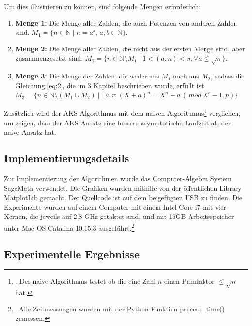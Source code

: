 \documentclass[12pt,oneside]{article}
\theoremstyle{remark}
\theoremstyle{definition}
\begin{document}
Um dies illustrieren zu können, sind folgende Mengen erforderlich:
\begin{enumerate}
    \item \textbf{Menge 1:} Die Menge aller Zahlen, die auch Potenzen von anderen Zahlen sind. $M_1 = \{ n \in \mathbb{N} \mid n = a^b, \, a,b \in \mathbb{N}\}$.\newline
    
    \item \textbf{Menge 2:} Die Menge aller Zahlen, die nicht aus der ersten Menge sind, aber zusammengesetzt sind. $M_2 = \{ n \in \mathbb{N}\setminus	 M_1 \mid 1 < (a,n) < n, \forall a \leq \sqrt{n} \}$.\newline
    
    \item \textbf{Menge 3:} Die Menge der Zahlen, die weder aus $M_1$ noch aus $M_2$, sodass die Gleichung \ref{eq:2}, die im 3 Kapitel beschrieben wurde, erfüllt ist. $M_3 = \{ n \in \mathbb{N} \setminus (M_1 \cup M_2) \mid \exists a,r : (X + a)^n = X^n + a \, (\, mod \, X^r - 1,p) \}$
\end{enumerate}

Zusätzlich wird der AKS-Algorithmus mit dem naiven Algorithmus\footnote{. Der naive Algorithmus testet ob die eine Zahl $n$ einen Primfaktor $\leq  \sqrt{n}$ hat.} verglichen, um zeigen, dass der AKS-Ansatz eine bessere asymptotische Laufzeit als der naive Ansatz hat.

\subsection{Implementierungsdetails}
Zur Implementierung der Algorithmen wurde das Computer-Algebra System SageMath verwendet. Die Grafiken wurden mithilfe von der öffentlichen Library MatplotLib gemacht. Der Quellcode ist auf dem beigefügten USB zu finden. Die Experimente wurden auf einem Computer mit einem Intel Core i7 mit vier Kernen, die jeweils auf 2,8 GHz getaktet sind, und mit 16GB Arbeitsspeicher unter Mac OS Catalina 10.15.3 ausgeführt.\footnote{$\,$ Alle Zeitmessungen wurden mit der Python-Funktion process\_time() gemessen.}

\subsection{Experimentelle Ergebnisse}
\end{document}
